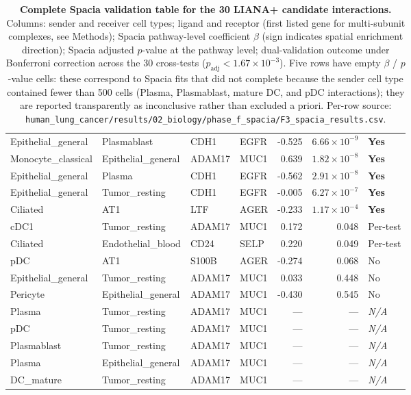 \documentclass[12pt,a4paper]{article}
\begin{document}
\begin{table}[h!]
\begin{tabular}{@{}llllrrl@{}}
Epithelial\_general & Plasmablast & CDH1 & EGFR & -0.525 & $6.66{\times}10^{-9}$ & \textbf{Yes} \\
Monocyte\_classical & Epithelial\_general & ADAM17 & MUC1 & 0.639 & $1.82{\times}10^{-8}$ & \textbf{Yes} \\
Epithelial\_general & Plasma & CDH1 & EGFR & -0.562 & $2.91{\times}10^{-8}$ & \textbf{Yes} \\
Epithelial\_general & Tumor\_resting & CDH1 & EGFR & -0.005 & $6.27{\times}10^{-7}$ & \textbf{Yes} \\
Ciliated & AT1 & LTF & AGER & -0.233 & $1.17{\times}10^{-4}$ & \textbf{Yes} \\
cDC1 & Tumor\_resting & ADAM17 & MUC1 & 0.172 & 0.048 & Per-test \\
Ciliated & Endothelial\_blood & CD24 & SELP & 0.220 & 0.049 & Per-test \\
pDC & AT1 & S100B & AGER & -0.274 & 0.068 & No \\
Epithelial\_general & Tumor\_resting & ADAM17 & MUC1 & 0.033 & 0.448 & No \\
Pericyte & Epithelial\_general & ADAM17 & MUC1 & -0.430 & 0.545 & No \\
Plasma & Tumor\_resting & ADAM17 & MUC1 & --- & --- & \textit{N/A} \\
pDC & Tumor\_resting & ADAM17 & MUC1 & --- & --- & \textit{N/A} \\
Plasmablast & Tumor\_resting & ADAM17 & MUC1 & --- & --- & \textit{N/A} \\
Plasma & Epithelial\_general & ADAM17 & MUC1 & --- & --- & \textit{N/A} \\
DC\_mature & Tumor\_resting & ADAM17 & MUC1 & --- & --- & \textit{N/A} \\
\bottomrule
\end{tabular}
\caption{\textbf{Complete Spacia validation table for the 30 LIANA+ candidate interactions.} Columns: sender and receiver cell types; ligand and receptor (first listed gene for multi-subunit complexes, see Methods); Spacia pathway-level coefficient $\beta$ (sign indicates spatial enrichment direction); Spacia adjusted $p$-value at the pathway level; dual-validation outcome under Bonferroni correction across the 30 cross-tests ($p_{\text{adj}} < 1.67 \times 10^{-3}$). Five rows have empty $\beta$ / $p$-value cells: these correspond to Spacia fits that did not complete because the sender cell type contained fewer than 500 cells (Plasma, Plasmablast, mature DC, and pDC interactions); they are reported transparently as inconclusive rather than excluded a priori. Per-row source: \texttt{human\_lung\_cancer/results/02\_biology/phase\_f\_spacia/F3\_spacia\_results.csv}.}
\label{tab:s4}
\end{table}
\end{document}
